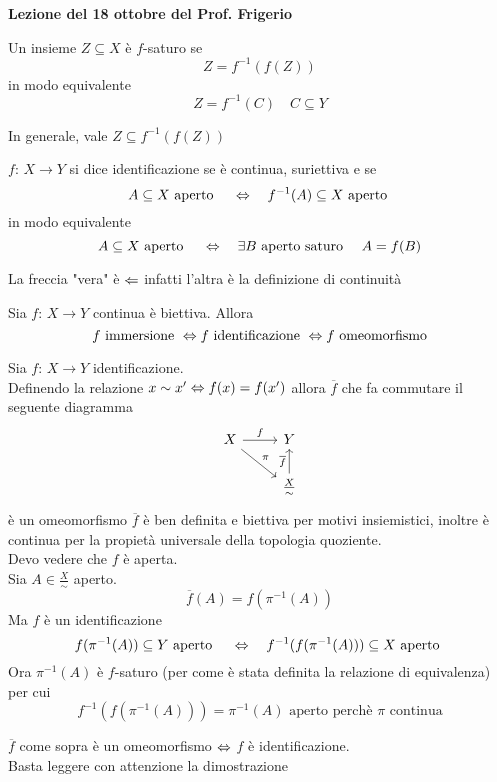 

\textbf{Lezione del 18 ottobre del Prof. Frigerio}
\begin{defn}Un insieme $Z\subseteq X $ \`e $f$-saturo se 
$$ Z = f^{-1}(f(Z))$$ 
in modo equivalente
$$ Z = f^{-1}(C) \quad C\subseteq Y$$

\begin{oss}In generale, vale $ Z \subseteq f^{-1}(f(Z))$
\end{oss}
\end{defn}
\begin{defn}[Identificazione]\bianco
$f:\, X \to Y$ si dice identificazione se \`e continua, suriettiva e se 
$$ A\subseteq X \text{ aperto } \quad \Leftrightarrow \quad f^{-1}(A)\subseteq X \text{ aperto }$$
in modo equivalente
$$ A\subseteq X \text{ aperto } \quad \Leftrightarrow \quad \exists B \text{ aperto saturo } \quad A= f(B)$$
\end{defn}
\begin{oss}La freccia "vera" \`e $\Leftarrow$ infatti l'altra \`e la definizione di continuit\`a
\end{oss}
\begin{oss}Sia $f:\, X \to Y $ continua \`e biettiva. Allora
$$ f\text{ immersione } \Leftrightarrow f \text{ identificazione } \Leftrightarrow f \text{ omeomorfismo}$$
\end{oss}
\spazio
\begin{prop}Sia $f:\, X \to Y$ identificazione.\\
Definendo la relazione $x\sim x' \Leftrightarrow f(x)=f(x')$ allora $\overline{f}$ che fa commutare il seguente diagramma
$$ \begin{tikzcd} X \arrow[r,"f"] 
\arrow{rd}{\pi}&Y\\ &\frac{X}{\sim} \arrow{u}{\overline{f}}
\end{tikzcd}$$
\`e un omeomorfismo 
\proof $\overline{f}$ \`e ben definita e biettiva per motivi insiemistici, inoltre \`e continua per la propiet\`a universale della topologia quoziente.\\
Devo vedere che $f$ \`e aperta.\\
Sia $A\in \frac{X}{\sim}$ aperto.\\
$$ \overline{f}(A)= f(\pi^{-1}(A))$$
Ma $f$ \`e un identificazione  
$$f(\pi^{-1}(A))  \subseteq Y \text{ aperto } \quad \Leftrightarrow  \quad f^{-1}(f(\pi^{-1}(A))) \subseteq X \text{ aperto }$$
Ora $\pi^{-1}(A)$ \`e $f$-saturo (per come \`e stata definita la relazione di equivalenza) per cui 
$$f^{-1}(f(\pi^{-1}(A)))=\pi^{-1}(A) \text{ aperto perch\`e  } \pi \text{ continua}$$
\begin{oss} $\overline{f} $ come sopra \`e un omeomorfismo $\Leftrightarrow$ $f$ \`e identificazione.\\
Basta leggere con attenzione la dimostrazione 
\end{oss} 
\end{prop}
